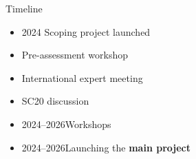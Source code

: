 \documentclass[aspectratio=169,fleqn]{beamer}
\begin{document}

\begin{frame}{Timeline}
  \begin{itemize}
    \item[] 2024 \quad Scoping project launched\\[1ex]
    \item[] \phantom{2024} \quad Pre-assessment workshop\\[1ex]
    \item[] \phantom{2024} \quad International expert meeting\\[1ex]
    \item[] \phantom{2024} \quad SC20 discussion\\[3ex]
    \item[] 2024--2026\quad Workshops\\[3ex]
    \item[] 2024--2026\quad Launching the {\darkgreen\bf main project}\\[3ex]
  \end{itemize}
\end{frame}

\end{document}
